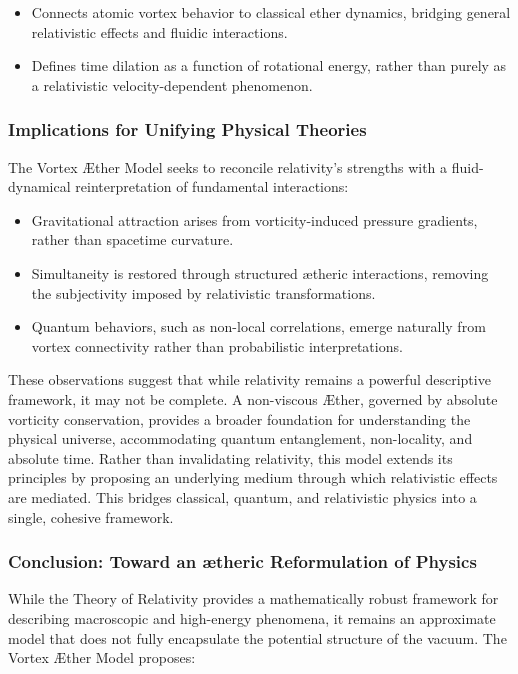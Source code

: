 \begin{itemize}
    \item Connects atomic vortex behavior to classical ether dynamics, bridging general relativistic effects and fluidic interactions.
    \item Defines time dilation as a function of rotational energy, rather than purely as a relativistic velocity-dependent phenomenon.
\end{itemize}
\subsubsection*{Implications for Unifying Physical Theories}
The Vortex Æther Model seeks to reconcile relativity’s strengths with a fluid-dynamical reinterpretation of fundamental interactions:

\begin{itemize}
    \item Gravitational attraction arises from vorticity-induced pressure gradients, rather than spacetime curvature.
    \item Simultaneity is restored through structured ætheric interactions, removing the subjectivity imposed by relativistic transformations.
    \item Quantum behaviors, such as non-local correlations, emerge naturally from vortex connectivity rather than probabilistic interpretations.
\end{itemize}
These observations suggest that while relativity remains a powerful descriptive framework, it may not be complete. A non-viscous Æther, governed by absolute vorticity conservation, provides a broader foundation for understanding the physical universe, accommodating quantum entanglement, non-locality, and absolute time.
Rather than invalidating relativity, this model extends its principles by proposing an underlying medium through which relativistic effects are mediated.
This bridges classical, quantum, and relativistic physics into a single, cohesive framework.

\subsubsection*{Conclusion: Toward an ætheric Reformulation of Physics}
While the Theory of Relativity provides a mathematically robust framework for describing macroscopic and high-energy phenomena, it remains an approximate model that does not fully encapsulate the potential structure of the vacuum.
The Vortex Æther Model proposes:

